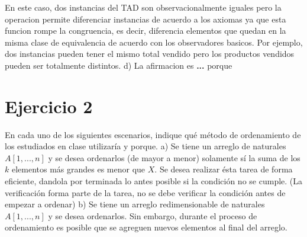 \documentclass[10pt,a4paper]{article}
\begin{document}
\medskip
\medskip
En este caso, dos instancias del TAD  son observacionalmente iguales pero la operacion  permite diferenciar instancias de acuerdo a los axiomas ya que esta funcion rompe la congruencia, es decir, diferencia elementos que quedan en la misma clase de equivalencia de acuerdo con los observadores basicos. Por ejemplo, dos instancias pueden tener el mismo total vendido pero los productos vendidos pueden ser totalmente distintos.   
\newline
\newline
d) La afirmacion es \textbf{...} porque 
\newpage

\section{Ejercicio 2}

En cada uno de los siguientes escenarios, indique qué método de ordenamiento de los estudiados en clase utilizaría y porque.
\newline
\newline
a) Se tiene un arreglo de naturales $A[1,...,n]$ y se desea ordenarlos (de mayor a menor) solamente sí la suma de los $k$ elementos más grandes es menor que $X$. Se desea realizar ésta tarea de forma eficiente, dandola por terminada lo antes posible si la condición no se cumple. (La verificación forma parte de la tarea, no se debe verificar la condición antes de empezar a ordenar)
\newline
\newline
b) Se tiene un arreglo redimensionable de naturales $A[1,...,n]$ y se desea ordenarlos. Sin embargo, durante el proceso de ordenamiento es posible que se agreguen nuevos elementos al final del arreglo.
\newline
\newline
\end{document}
